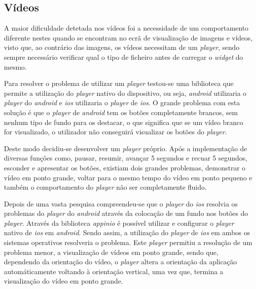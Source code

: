 \subsection{Vídeos}

A maior dificuldade detetada nos vídeos foi a necessidade de um comportamento diferente nestes quando se encontram no ecrã de visualização de imagens e vídeos, visto que, ao contrário das imagens, os vídeos necessitam de um \textit{player}, sendo sempre necessário verificar qual o tipo de ficheiro antes de carregar o \textit{widget} do mesmo.

Para resolver o problema de utilizar um \textit{player} testou-se uma biblioteca que permite a utilização do \textit{player} nativo do dispositivo, ou seja, \textit{android} utilizaria o \textit{player} do \textit{android} e \textit{ios} utilizaria o \textit{player} de \textit{ios}. O grande problema com esta solução é que o \textit{player} de \textit{android} tem os botões completamente brancos, sem nenhum tipo de fundo para os destacar, o que significa que se um vídeo branco for visualizado, o utilizador não conseguirá visualizar os botões do \textit{player}.

Deste modo decidiu-se desenvolver um \textit{player} próprio. Após a implementação de diversas funções como, pausar, resumir, avançar 5 segundos e recuar 5 segundos, esconder e apresentar os botões, existiam dois grandes problemas, demonstrar o vídeo em ponto grande, voltar para o mesmo tempo do vídeo em ponto pequeno e também o comportamento do \textit{player} não ser completamente fluido.

Depois de uma vasta pesquisa compreendeu-se que o \textit{player} do \textit{ios} resolvia os problemas do \textit{player} do \textit{android} através da colocação de um fundo nos botões do \textit{player}. Através da biblioteca \textit{appinio} é possível utilizar e configurar o \textit{player} nativo de \textit{ios} em \textit{android}. Sendo assim, a utilização do \textit{player} de \textit{ios} em ambos os sistemas operativos resolveria o problema. Este \textit{player} permitiu a resolução de um problema menor, a visualização de vídeos em ponto grande, sendo que, dependendo da orientação do vídeo, o \textit{player} altera a orientação da aplicação automáticamente voltando à orientação vertical, uma vez que, termina a visualização do vídeo em ponto grande.